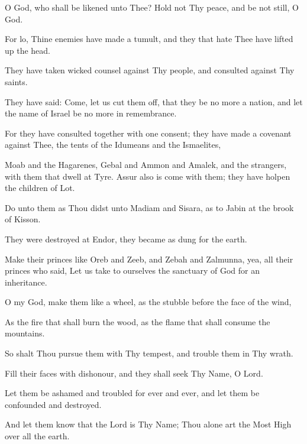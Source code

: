 O God, who shall be likened unto Thee? Hold not Thy peace, and be not still, O God.

For lo, Thine enemies have made a tumult, and they that hate Thee have lifted up the head.

They have taken wicked counsel against Thy people, and consulted against Thy saints.

They have said: Come, let us cut them off, that they be no more a nation, and let the name of Israel be no more in remembrance.

For they have consulted together with one consent; they have made a covenant against Thee, the tents of the Idumeans and the Ismaelites,

Moab and the Hagarenes, Gebal and Ammon and Amalek, and the strangers, with them that dwell at Tyre. Assur also is come with them; they have holpen the children of Lot.

Do unto them as Thou didst unto Madiam and Sisara, as to Jabin at the brook of Kisson.

They were destroyed at Endor, they became as dung for the earth.

Make their princes like Oreb and Zeeb, and Zebah and Zalmunna, yea, all their princes who said, Let us take to ourselves the sanctuary of God for an inheritance.

O my God, make them like a wheel, as the stubble before the face of the wind,

As the fire that shall burn the wood, as the flame that shall consume the mountains.

So shalt Thou pursue them with Thy tempest, and trouble them in Thy wrath.

Fill their faces with dishonour, and they shall seek Thy Name, O Lord.

Let them be ashamed and troubled for ever and ever, and let them be confounded and destroyed.

And let them know that the Lord is Thy Name; Thou alone art the Most High over all the earth.
